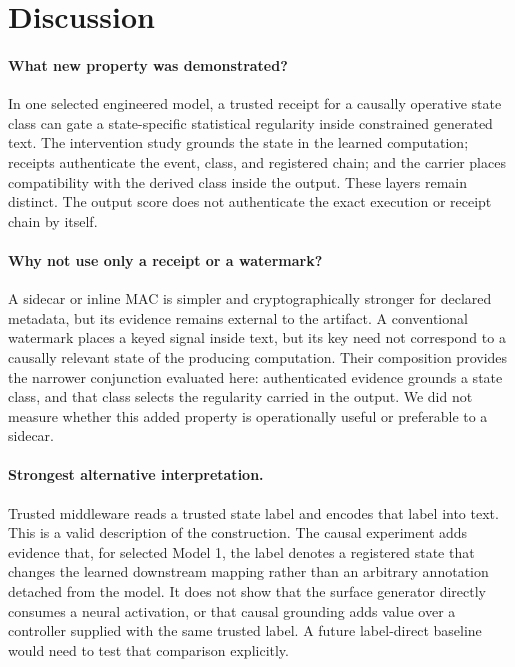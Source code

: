 \section{Discussion}

\paragraph{What new property was demonstrated?}
In one selected engineered model, a trusted receipt for a causally operative
state class can gate a state-specific statistical regularity inside constrained
generated text. The intervention study grounds the state in the learned
computation; receipts authenticate the event, class, and registered chain; and
the carrier places compatibility with the derived class inside the output.
These layers remain distinct. The output score does not authenticate the exact
execution or receipt chain by itself.

\paragraph{Why not use only a receipt or a watermark?}
A sidecar or inline MAC is simpler and cryptographically stronger for declared
metadata, but its evidence remains external to the artifact. A conventional
watermark places a keyed signal inside text, but its key need not correspond to
a causally relevant state of the producing computation. Their composition
provides the narrower conjunction evaluated here: authenticated evidence
grounds a state class, and that class selects the regularity carried in the
output. We did not measure whether this added property is operationally useful
or preferable to a sidecar.

\paragraph{Strongest alternative interpretation.}
Trusted middleware reads a trusted state label and encodes that label into
text. This is a valid description of the construction. The causal experiment
adds evidence that, for selected Model 1, the label denotes a registered state
that changes the learned downstream mapping rather than an arbitrary
annotation detached from the model. It does not show that the surface generator
directly consumes a neural activation, or that causal grounding adds value over
a controller supplied with the same trusted label. A future label-direct
baseline would need to test that comparison explicitly.

